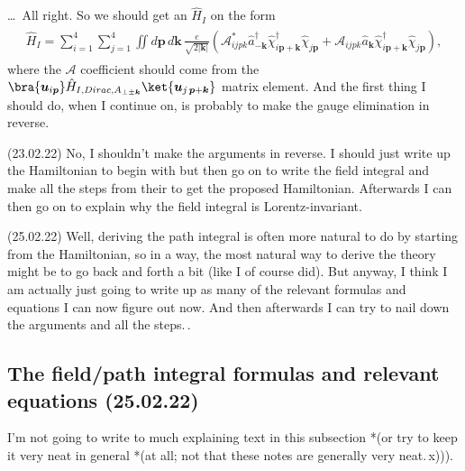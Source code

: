 \documentclass{report}
\begin{document}
\ldots\ All right. So we should get an $\hat H_I$ on the form
\begin{align}
\begin{aligned}
	\hat H_{I} = \sum_{i=1}^4\sum_{j=1}^4 \iint d\boldsymbol{p}\, d\boldsymbol{k}\, 
		\frac{e}{\sqrt{2 |\boldsymbol{k}|}}(
			\mathcal{A}_{i j p k}^* \hat a^\dagger_{-\boldsymbol{k}}	
				\hat \chi^\dagger_{i \boldsymbol{p} + \boldsymbol{k}} \hat \chi_{j \boldsymbol{p}} +
			\mathcal{A}_{i j p k} \hat a_{\boldsymbol{k}}
				\hat \chi^\dagger_{i \boldsymbol{p} + \boldsymbol{k}} \hat \chi_{j \boldsymbol{p}}
		),
	\label{H_I_form_02}
\end{aligned}
\end{align}
where the $\mathcal{A}$ coefficient should come from the 
$\bra{\boldsymbol{u}_{i \boldsymbol{p}}} 
\hat H_{I, Dirac, A_{\perp \pm\boldsymbol{k}}} 
\ket{\boldsymbol{u}_{j\, \boldsymbol{p} + \boldsymbol{k}}}$ 
matrix element. And the first thing I should do, when I continue on, is probably to make the gauge elimination in reverse. 


(23.02.22) No, I shouldn't make the arguments in reverse. I should just write up the Hamiltonian to begin with but then go on to write the field integral and make all the steps from their to get the proposed Hamiltonian. Afterwards I can then go on to explain why the field integral is Lorentz-invariant. 

(25.02.22) Well, deriving the path integral is often more natural to do by starting from the Hamiltonian, so in a way, the most natural way to derive the theory might be to go back and forth a bit (like I of course did). But anyway, I think I am actually just going to write up as many of the relevant formulas and equations I can now figure out now. And then afterwards I can try to nail down the arguments and all the steps.\,. 




\subsection{The field/path integral formulas and relevant equations (25.02.22)}
I'm not going to write to much explaining text in this subsection *(or try to keep it very neat in general *(at all; not that these notes are generally very neat.\,x))).
\end{document}
